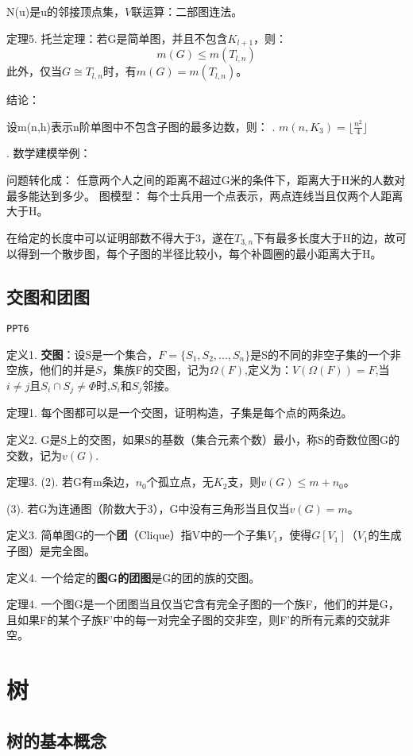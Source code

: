 \documentclass{article}
\begin{document}
N(u)是u的邻接顶点集，$V$联运算：二部图连法。

定理5. 托兰定理：若G是简单图，并且不包含$K_{l+1}$，则：
$$m(G) \le m(T_{l,n})$$此外，仅当$G \cong T_{l,n}$时，有$m(G) = m(T_{l,n})$。

结论：

设m(n,h)表示n阶单图中不包含子图的最多边数，则：
. $m(n,K_3) = \lfloor \frac{n^2}{4} \rfloor$

. 数学建模举例：

问题转化成：
任意两个人之间的距离不超过G米的条件下，距离大于H米的人数对最多能达到多少。
图模型：
每个士兵用一个点表示，两点连线当且仅两个人距离大于H。

在给定的长度中可以证明部数不得大于3，遂在$T_{3,n}$下有最多长度大于H的边，故可以得到一个散步图，每个子图的半径比较小，每个补圆圈的最小距离大于H。

\subsection{交图和团图}

\texttt{PPT6}

定义1.  \textbf{交图}：设S是一个集合，$F = \{S_1,S_2,...,S_n\}$是S的不同的非空子集的一个非空族，他们的并是$S$，集族F的交图，记为$\Omega(F)$,定义为：$V(\Omega(F)) = F$,当$i \ne j$且$S_i \cap S_j \ne \Phi$时,$S_i$和$S_j$邻接。

定理1. 每个图都可以是一个交图，证明构造，子集是每个点的两条边。

定义2. G是S上的交图，如果S的基数（集合元素个数）最小，称S的奇数位图G的交数，记为$v(G)$.

定理3. 
\quad(2). 若G有m条边，$n_0$个孤立点，无$K_2$支，则$v(G) \le m + n_0$。

\quad(3). 若G为连通图（阶数大于3），G中没有三角形当且仅当$v(G) = m$。

定义3. 简单图G的一个\textbf{团}（Clique）指V中的一个子集$V_1$，使得$G[V_1]$（$V_1$的生成子图）是完全图。

定义4. 一个给定的\textbf{图G的团图}是G的团的族的交图。

定理4. 一个图G是一个团图当且仅当它含有完全子图的一个族F，他们的并是G，且如果F的某个子族F'中的每一对完全子图的交非空，则F'的所有元素的交就非空。

\section{树}

\subsection{树的基本概念}
\end{document}
